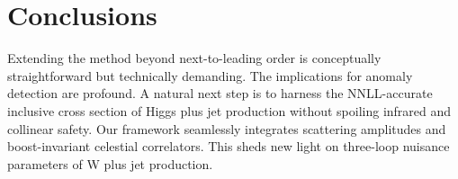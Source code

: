 \section{Conclusions}\label{sec:conclusions}

Extending the method beyond next-to-leading order is conceptually
straightforward but technically demanding. The implications for anomaly
detection are profound. A natural next step is to harness the
NNLL-accurate inclusive cross section of Higgs plus jet production
without spoiling infrared and collinear safety. Our framework seamlessly
integrates scattering amplitudes and boost-invariant celestial
correlators. This sheds new light on three-loop nuisance parameters of W
plus jet production.

